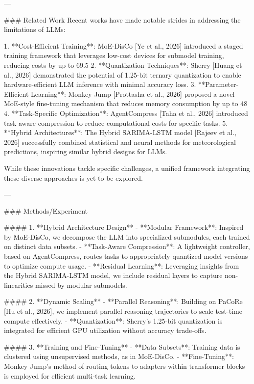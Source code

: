 ---

### Related Work  
Recent works have made notable strides in addressing the limitations of LLMs:

1. **Cost-Efficient Training**: MoE-DisCo [Ye et al., 2026] introduced a staged training framework that leverages low-cost devices for submodel training, reducing costs by up to 69.5%
2. **Quantization Techniques**: Sherry [Huang et al., 2026] demonstrated the potential of 1.25-bit ternary quantization to enable hardware-efficient LLM inference with minimal accuracy loss.  
3. **Parameter-Efficient Learning**: Monkey Jump [Prottasha et al., 2026] proposed a novel MoE-style fine-tuning mechanism that reduces memory consumption by up to 48%
4. **Task-Specific Optimization**: AgentCompress [Taha et al., 2026] introduced task-aware compression to reduce computational costs for specific tasks.  
5. **Hybrid Architectures**: The Hybrid SARIMA-LSTM model [Rajeev et al., 2026] successfully combined statistical and neural methods for meteorological predictions, inspiring similar hybrid designs for LLMs.

While these innovations tackle specific challenges, a unified framework integrating these diverse approaches is yet to be explored.

---

### Methods/Experiment  

#### 1. **Hybrid Architecture Design**
   - **Modular Framework**: Inspired by MoE-DisCo, we decompose the LLM into specialized submodules, each trained on distinct data subsets.  
   - **Task-Aware Compression**: A lightweight controller, based on AgentCompress, routes tasks to appropriately quantized model versions to optimize compute usage.  
   - **Residual Learning**: Leveraging insights from the Hybrid SARIMA-LSTM model, we include residual layers to capture non-linearities missed by modular submodels.

#### 2. **Dynamic Scaling**
   - **Parallel Reasoning**: Building on PaCoRe [Hu et al., 2026], we implement parallel reasoning trajectories to scale test-time compute effectively.  
   - **Quantization**: Sherry's 1.25-bit quantization is integrated for efficient GPU utilization without accuracy trade-offs.

#### 3. **Training and Fine-Tuning**
   - **Data Subsets**: Training data is clustered using unsupervised methods, as in MoE-DisCo.  
   - **Fine-Tuning**: Monkey Jump's method of routing tokens to adapters within transformer blocks is employed for efficient multi-task learning.

